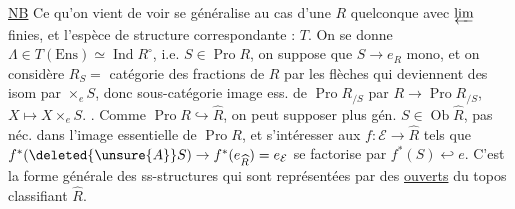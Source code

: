 \uline{NB} Ce qu'on vient de voir se généralise au cas d'une $R$ quelconque avec $\varprojlim$ finies, et l'espèce de structure correspondante : $T$.
On se donne $\Lambda\in T(\mathrm{Ens})\simeq\operatorname{Ind}R^\circ$, i.e. $S\in\operatorname{Pro} R$,
on suppose que $S\to e_R$  mono, et on considère $R_S=$ catégorie des fractions de $R$ par les flèches qui deviennent des isom par $\times_e S$,
donc sous-catégorie image ess. de $\operatorname{Pro}R_{/S}$ par $R\to\operatorname{Pro}R_{/S}$, $X\mapsto X\times_e S$. .
Comme $\operatorname{Pro} R\hookrightarrow\widehat R$,  on peut supposer plus gén. $S\in\operatorname{Ob}\widehat R$, 
pas néc. dans l'image essentielle de $\operatorname{Pro} R$, et s'intéresser aux $f:\mathcal E\to\widehat R$ tels que
$f^*(\deleted{\unsure{A}}S)\to f^*(e_{\widehat R})=e_{\mathcal E}$ se factorise par $f^*(S)\hookleftarrow e$.
C'est la forme générale des ss-structures qui sont représentées par des \uline{ouverts} du topos classifiant $\widehat R$.

